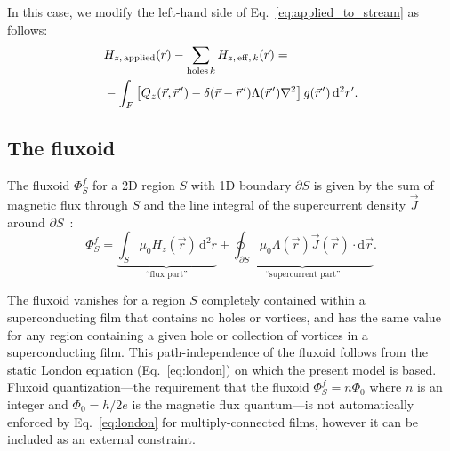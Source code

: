\documentclass[final,3p,times,twocolumn]{elsarticle}
\newcommand{\pvec}[1]{\vec{#1}\mkern2mu\vphantom{#1}}
\newcounter{bla}
\begin{document}
In this case, we modify the left-hand side of Eq.~\ref{eq:applied_to_stream} as follows:
\begin{align}
\begin{split}
    \label{eq:Heff_sub}
    &H_{z,\,\mathrm{applied}}(\vec{r}) - \sum_{\mathrm{holes}\,k} H_{z,\,\mathrm{eff},\,k}(\vec{r})
    = \\&-\int_F\left[
        Q_z(\vec{r},\pvec{r}')-\delta(\vec{r}-\pvec{r}')\Lambda(\pvec{r}')\nabla^2\right
    ]g(\pvec{r}')\,\mathrm{d}^2r'.
\end{split}
\end{align}

\subsection{The fluxoid}
\label{section:model:fluxoid}

The fluxoid $\Phi^f_S$ for a 2D region $S$ with 1D boundary $\partial S$ is given by the sum of magnetic flux through $S$ and the line integral of the supercurrent density $\vec{J}$ around $\partial S$~\cite{Brandt2005-wj,Clem2005-ye,Tinkham2004-zn}:
\begin{equation}
    \Phi^f_S = \underbrace{\int_S\mu_0H_z(\vec{r})\,\mathrm{d}^2r}_\text{``flux part''} + \underbrace{\oint_{\partial S}\mu_0\Lambda(\vec{r})\vec{J}(\vec{r})\cdot\mathrm{d}\vec{r}}_\text{``supercurrent part''}.
    \label{eq:fluxoid}
\end{equation}

The fluxoid vanishes for a region $S$ completely contained within a superconducting film that contains no holes or vortices, and has the same value for any region containing a given hole or collection of vortices in a superconducting film. This path-independence of the fluxoid follows from the static London equation (Eq.~\ref{eq:london}) on which the present model is based. Fluxoid quantization---the requirement that the fluxoid $\Phi^f_S=n\Phi_0$ where $n$ is an integer and $\Phi_0=h/2e$ is the magnetic flux quantum---is not automatically enforced by Eq.~\ref{eq:london} for multiply-connected films, however it can be included as an external constraint.
\end{document}
